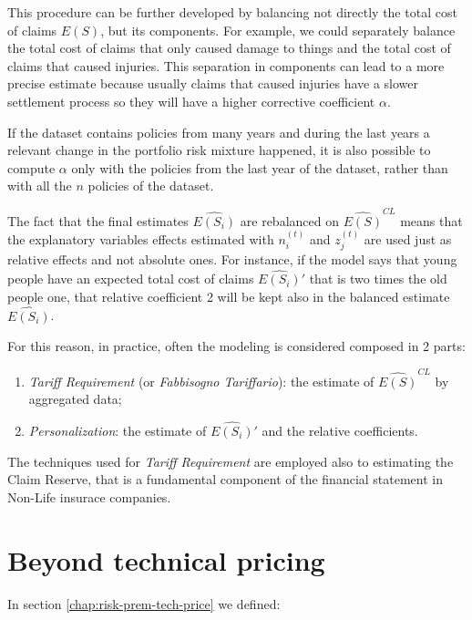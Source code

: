 \documentclass[a4paper, nobind]{templates/ociamthesis}
\providecommand{\tightlist}{%
  \setlength{\itemsep}{0pt}\setlength{\parskip}{0pt}}
\theoremstyle{definition}
\theoremstyle{definition}
\theoremstyle{definition}
\theoremstyle{remark}
\begin{document}
This procedure can be further developed by balancing not directly the total cost of claims \(E(S)\), but its components. For example, we could separately balance the total cost of claims that only caused damage to things and the total cost of claims that caused injuries. This separation in components can lead to a more precise estimate because usually claims that caused injuries have a slower settlement process so they will have a higher corrective coefficient \(\alpha\).

If the dataset contains policies from many years and during the last years a relevant change in the portfolio risk mixture happened, it is also possible to compute \(\alpha\) only with the policies from the last year of the dataset, rather than with all the \(n\) policies of the dataset.

The fact that the final estimates \(\widehat{E(S_i)}\) are rebalanced on \(\widehat{E(S)}^{CL}\) means that the explanatory variables effects estimated with \(n_i^{(t)}\) and \(z_j^{(t)}\) are used just as relative effects and not absolute ones. For instance, if the model says that young people have an expected total cost of claims \(\widehat{E(S_i)}'\) that is two times the old people one, that relative coefficient 2 will be kept also in the balanced estimate \(\widehat{E(S_i)}\).

For this reason, in practice, often the modeling is considered composed in 2 parts:

\begin{enumerate}
\def\labelenumi{\arabic{enumi}.}
\tightlist
\item
  \emph{Tariff Requirement} (or \emph{Fabbisogno Tariffario}): the estimate of \(\widehat{E(S)}^{CL}\) by aggregated data;
\item
  \emph{Personalization}: the estimate of \(\widehat{E(S_i)}'\) and the relative coefficients.
\end{enumerate}

The techniques used for \emph{Tariff Requirement} are employed also to estimating the Claim Reserve, that is a fundamental component of the financial statement in Non-Life insurace companies.

\hypertarget{beyond-technical-pricing}{%
\section{Beyond technical pricing}\label{beyond-technical-pricing}}

In section \ref{chap:risk-prem-tech-price} we defined:
\end{document}
